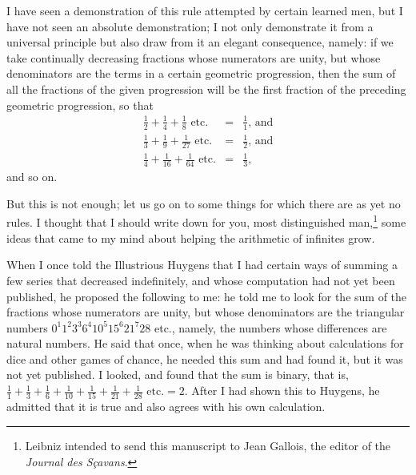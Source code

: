 \documentclass[twoside,openright]{article}
\newlength{\oldjot}
\begin{document}
I have seen a demonstration of this rule attempted by certain learned men, but
I have not seen an absolute demonstration; I not only demonstrate it from a universal principle but
also draw from it
    an elegant consequence, namely: if we take continually decreasing
    fractions whose numerators are unity, but whose denominators are the terms
    in a certain geometric progression, then the sum of all the fractions of
    the given progression will be the first fraction of the preceding
    geometric progression, so that
\setlength{\jot}{2ex}
\begin{eqnarray*}
\frac{1}{2} + \frac{1}{4} + \frac{1}{8} \mbox{ etc.} & = & \frac{1}{1}\mbox{, and}\\
\frac{1}{3} + \frac{1}{9} + \frac{1}{27} \mbox{ etc.} & = & \frac{1}{2}\mbox{, and}\\
\frac{1}{4} + \frac{1}{16} + \frac{1}{64} \mbox{ etc.} &  = & \frac{1}{3},
\end{eqnarray*}
\setlength{\jot}{\oldjot}
 and so on.

But this is not enough; let us go on to some things for which there are as yet
no rules.  I thought that I should write down for you, most distinguished
man,\footnote{Leibniz intended to send this manuscript to Jean Gallois, the editor of the \emph{Journal des S\c{c}avans}.} some ideas that came to my mind about
helping the arithmetic of infinites grow.

\label{beghar} When I once told the Illustrious Huygens that I had certain ways of summing a
few series that decreased indefinitely, and whose computation had not yet been
published, he proposed the following to me: he told me to look for the sum of
the fractions whose numerators are unity, but whose denominators are the
triangular numbers $0^1 1^2 3^3 6^4 10^5 15^6 21^7 28$ etc., namely, the numbers
whose differences are natural numbers.  He said that once, when he was
thinking about calculations for dice and other games of chance, he needed this
sum and had found it, but it was not yet published.  I looked, and found that
the sum is binary, that is, $\frac{1}{1} + \frac{1}{3} + \frac{1}{6} +
\frac{1}{10} +\frac{1}{15} + \frac{1}{21} +\frac{1}{28} \mbox{ etc.} = 2.$
After I had shown this to Huygens, he admitted that it is true and also agrees
with his own calculation.
\end{document}
